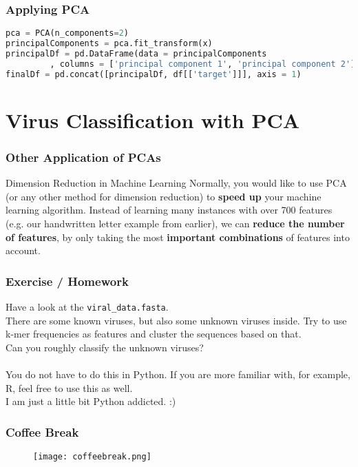 \begin{frame}[c, fragile]\frametitle{Applying PCA}
  \begin{lstlisting}[language=Python, showstringspaces=false]    
pca = PCA(n_components=2)
principalComponents = pca.fit_transform(x)
principalDf = pd.DataFrame(data = principalComponents
         , columns = ['principal component 1', 'principal component 2'])
finalDf = pd.concat([principalDf, df[['target']]], axis = 1)
  \end{lstlisting}
\end{frame}

\section[Classification]{Virus Classification with PCA}

\begin{frame}[c]\frametitle{Other Application of PCAs}
  \begin{block}{Dimension Reduction in Machine Learning}
    Normally, you would like to use PCA (or any other method for dimension reduction) to \textbf{speed up}
    your machine learning algorithm.
    Instead of learning many instances with over 700 features (e.g. our handwritten letter example from earlier),
    we can \textbf{reduce the number of features}, by only taking the most \textbf{important combinations} of features into account.
  \end{block}
\end{frame}

\begin{frame}[c]\frametitle{Exercise / Homework}
  \begin{block}{}
  Have a look at the \texttt{viral\_data.fasta}.\\
  There are some known viruses, but also some unknown viruses inside. Try to use k-mer frequencies as features 
  and cluster the sequences based on that.\\Can you roughly classify the unknown viruses?\\ \ \\
  {\tiny You do not have to do this in Python. If you are more familiar with, for example, R, feel free to use this as well.\\
  I am just a little bit Python addicted. :)}
  \end{block}
\end{frame}


\beginbackup

\begin{frame}[c]\frametitle{Coffee Break}
  \begin{figure}[htbp]
    \centering
    \texttt{[image: coffeebreak.png]}
  \end{figure}
\end{frame}

\backupend

